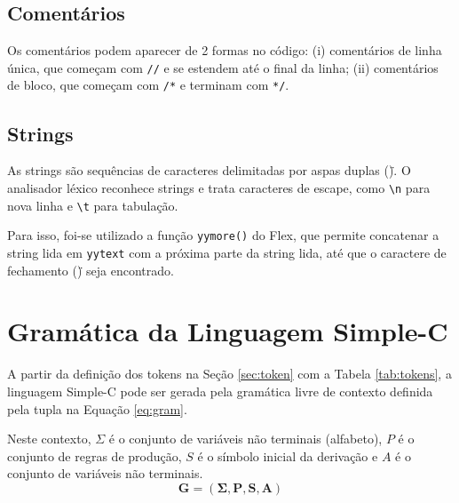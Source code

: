 \documentclass[12pt,a4paper]{article}
\begin{document}
\subsection{Comentários}
Os comentários podem aparecer de 2 formas no código: (i) comentários de linha única, que começam com \texttt{//} e se estendem até o final da linha; (ii) comentários de bloco, que começam com \texttt{/*} e terminam com \texttt{*/}.

\subsection{Strings}

As strings são sequências de caracteres delimitadas por aspas duplas (\texttt{\"}). O analisador léxico reconhece strings e trata caracteres de escape, como \texttt{\textbackslash n} para nova linha e \texttt{\textbackslash t} para tabulação.

Para isso, foi-se utilizado a função \texttt{yymore()} do Flex, que permite concatenar a string lida em \texttt{yytext} com a próxima parte da string lida, até que o caractere de fechamento (\texttt{\"}) seja encontrado.


\section{Gramática da Linguagem Simple-C}
\label{sec:gram}
A partir da definição dos tokens na Seção \ref{sec:token} com a Tabela \ref{tab:tokens}, a linguagem Simple-C pode ser gerada pela gramática livre de contexto definida pela tupla na Equação \ref{eq:gram}. 

Neste contexto, $\Sigma$ é o conjunto de variáveis não terminais (alfabeto), $P$ é o conjunto de regras de produção, $S$ é o símbolo inicial da derivação e $A$ é o conjunto de variáveis não terminais.
\begin{equation}
    \label{eq:gram}
    \boldsymbol{G = (\Sigma, P, S, A)}
\end{equation}
\end{document}
